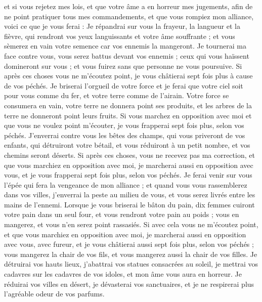 \begin{multicols}{2}
et si vous rejetez mes lois, et que votre âme a en horreur mes jugements, afin de ne point pratiquer tous mes commandements, et que vous rompiez mon alliance,
voici ce que je vous ferai : Je répandrai sur vous la frayeur, la langueur et la fièvre, qui rendront vos yeux languissants et votre âme souffrante ; et vous sèmerez en vain votre semence car vos ennemis la mangeront.
Je tournerai ma face contre vous, vous serez battus devant vos ennemis ; ceux qui vous haïssent domineront sur vous ; et vous fuirez sans que personne ne vous poursuive.
Si après ces choses vous ne m'écoutez point, je vous châtierai sept fois plus à cause de vos péchés.
Je briserai l'orgueil de votre force et je ferai que votre ciel soit pour vous comme du fer, et votre terre comme de l'airain.
Votre force se consumera en vain, votre terre ne donnera point ses produits, et les arbres de la terre ne donneront point leurs fruits.
Si vous marchez en opposition avec moi et que vous ne voulez point m'écouter, je vous frapperai sept fois plus, selon vos péchés.
J'enverrai contre vous les bêtes des champs, qui vous priveront de vos enfants, qui détruiront votre bétail, et vous réduiront à un petit nombre, et vos chemins seront déserts.
Si après ces choses, vous ne recevez pas ma correction, et que vous marchiez en opposition avec moi,
je marcherai aussi en opposition avec vous, et je vous frapperai sept fois plus, selon vos péchés.
Je ferai venir sur vous l'épée qui fera la vengeance de mon alliance ; et quand vous vous rassemblerez dans vos villes, j'enverrai la peste au milieu de vous, et vous serez livrés entre les mains de l'ennemi.
Lorsque je vous briserai le bâton du pain, dix femmes cuiront votre pain dans un seul four, et vous rendront votre pain au poids ; vous en mangerez, et vous n'en serez point rassasiés.
Si avec cela vous ne m'écoutez point, et que vous marchiez en opposition avec moi,
je marcherai aussi en opposition avec vous, avec fureur, et je vous châtierai aussi sept fois plus, selon vos péchés ;
vous mangerez la chair de vos fils, et vous mangerez aussi la chair de vos filles.
Je détruirai vos hauts lieux, j’abattrai vos statues consacrées au soleil, je mettrai vos cadavres sur les cadavres de vos idoles, et mon âme vous aura en horreur.
Je réduirai vos villes en désert, je dévasterai vos sanctuaires, et je ne respirerai plus l’agréable odeur de vos parfums.

\end{multicols}
